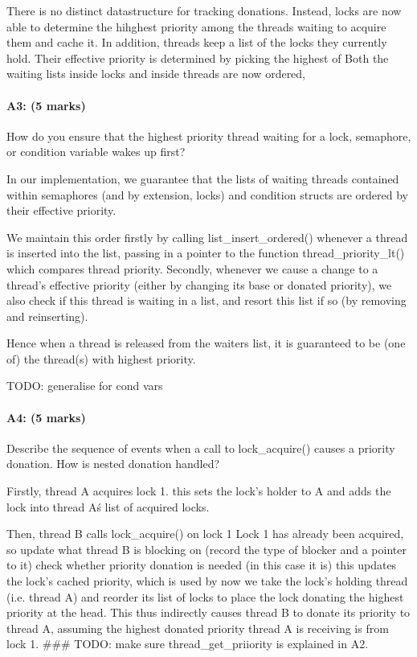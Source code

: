 There is no distinct datastructure for tracking donations.
Instead, locks are now able to determine the hihghest priority among the threads waiting to acquire them and cache it.
In addition, threads keep a list of the locks they currently hold. Their effective priority is determined by picking the highest of 
Both the waiting lists inside locks and inside threads are now ordered, 

\paragraph{A3: (5 marks)}
How do you ensure that the highest priority thread waiting for a lock, semaphore, or condition variable wakes up first?

In our implementation, we guarantee that the lists of waiting threads contained within semaphores (and by extension, locks) and condition structs are ordered by their effective priority.

We maintain this order firstly by calling list\_insert\_ordered() whenever a thread is inserted into the list, passing in a pointer to the function thread\_priority\_lt() which compares thread priority. Secondly, whenever we cause a change to a thread's effective priority (either by changing its base or donated priority), we also check if this thread is waiting in a list, and resort this list if so (by removing and reinserting).

Hence when a thread is released from the waiters list, it is guaranteed to be (one of) the thread(s) with highest priority.

TODO: generalise for cond vars

\paragraph{A4: (5 marks)}
Describe the sequence of events when a call to lock\_acquire() causes a priority donation.  How is nested donation handled?

  Firstly, thread A acquires lock 1.
    this sets the lock's holder to A and adds the lock into thread A\'s list of acquired locks.

  Then, thread B calls lock\_acquire() on lock 1
  Lock 1 has already been acquired, so
    update what thread B is blocking on (record the type of blocker and a pointer to it)
    check whether priority donation is needed (in this case it is)
      this updates the lock's cached priority, which is used by 
    now we take the lock's holding thread (i.e. thread A) and reorder its list of locks to place the lock donating the highest priority at the head. This thus indirectly causes thread B to donate its priority to thread A, assuming the highest donated priority thread A is receiving is from lock 1.
    \#\#\# TODO: make sure thread\_get\_priiority is explained in A2.

